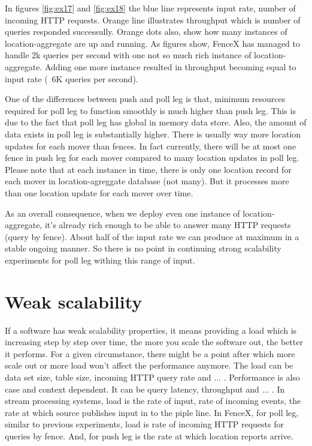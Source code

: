 \documentclass[a4]{report}
\begin{document}
        In figures \ref{fig:ex17} and \ref{fig:ex18} the blue line represents input rate, number of incoming HTTP
        requests.
        Orange line illustrates throughput which is number of queries responded successully.
        Orange dots also, show how many instances of location-aggregate are up and running.
        As figures show, FenceX has managed to handle 2k queries
        per second with one not so much rich instance of location-aggregate.
        Adding one more instance resulted in throughput becoming equal to input rate (~6K queries per second).

        One of the differences between push and poll leg is that, minimum resources required for poll leg to function
        smoothly is much higher than push leg.
        This is due to the fact that poll leg has global in memory data store.
        Also, the amount of data exists in poll leg is substantially higher.
        There is usually way more location updates for each mover than fences.
        In fact currently, there will be at most one fence in push leg for each mover compared to many location updates
        in poll leg.
        Please note that at each instance in time, there is only one location record for each mover in location-agreggate
        database (not many).
        But it processes more than one location update for each mover over time.

        As an overall consequence, when we deploy even one instance of location-aggregate, it's already rich enough to be
        able to answer many HTTP requests (query by fence).
        About half of the input rate we can produce at maximum in a stable ongoing manner.
        So there is no point in continuing strong scalability experiments for poll leg withing this range of input.


        \section{Weak scalability}
        If a software has weak scalability properties, it means providing a load which is increasing step by step over
        time, the more you scale the software out, the better it performs.
        For a given circumstance, there might be a point after which more scale out or more load won't affect
        the performance anymore.
        The load can be data set size, table size, incoming HTTP query rate and ... .
        Performance is also case and context dependent.
        It can be query latency, throughput and ... .
        In stream processing systems, load is the rate of input, rate of incoming events, the rate at
        which source publishes input in to the piple line.
        In FenceX, for poll leg, similar to previous experiments, load is rate of incoming HTTP requests for queries by
        fence.
        And, for push leg is the rate at which location reports arrive.
\end{document}
